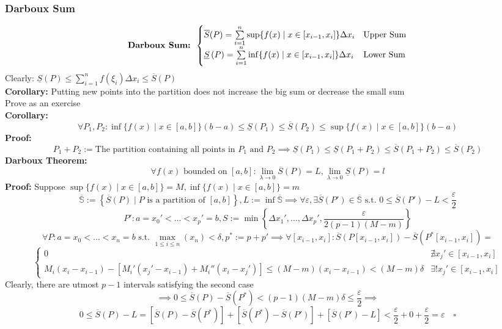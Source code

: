 \documentclass{article}
\newcommand{\st}{\mbox{ s.t. }}
\newcommand{\0}{{\bf{0}}}
\begin{document}
\subsubsection{Darboux Sum}
$$\text{\textbf{Darboux Sum: }}\begin{cases}
    \overline{S}(P)=\sum\limits_{i=1}^n\sup\{f(x)\mid x\in[x_{i-1},x_i]\}\Delta x_{i}&\mbox{Upper Sum}\\
    \underline{S}\left(P\right)=\sum\limits_{i=1}^n\inf\{f(x)\mid x\in[x_{i-1},x_i]\}\Delta x_{i}&\mbox{Lower Sum}
\end{cases}$$
Clearly: $\underline{S}(P)\le\sum\limits_{i=1}^{n}f\left(\xi_{i}\right)\Delta x_{i}\le\overline{S}(P)$\\
\textbf{Corollary: }Putting new points into the partition does not increase the big sum or decrease the small sum\\
\null\hfill{Prove as an exercise}\\
\textbf{Corollary:}
$$\forall P_1,P_2:\inf\{f(x)\mid x\in[a,b]\}(b-a)\le\underline{S}(P_1)\le\overline{S}(P_2)\le\sup\{f(x)\mid x\in[a,b]\}(b-a)$$
\textbf{Proof:}
$$P_1+P_2:=\mbox{The partition containing all points in }P_1\mbox{ and }P_2\implies\underline{S}(P_1)\le\underline{S}(P_1+P_2)\le\overline{S}(P_1+P_2)\le\overline{S}(P_2)$$
\textbf{Darboux Theorem:}
$$\forall f(x)\mbox{ bounded on }[a,b]:\lim_{\lambda\to0}\overline{S}(P)=L,\lim_{\lambda\to0}\underline{S}(P)=l$$
\textbf{Proof:}
Suppose $\sup\{f(x)\mid x\in[a,b]\}=M,\inf\{f(x)\mid x\in[a,b]\}=m$
$$\overline{\mathbb{S}}:=\left\{\overline{S}(P)\mid P\mbox{ is a partition of }[a,b]\right\},L:=\inf\overline{\mathbb{S}}\implies\forall\varepsilon,\exists\overline{S}(P')\in\overline{\mathbb{S}}\st0\le\overline{S}(P')-L<\frac{\varepsilon}{2}$$
$$P':a=x_0'<\dots<x_p'=b,S:=\min\left\{\Delta x_1',\dots,\Delta x_p',\frac{\varepsilon}{2(p-1)(M-m)}\right\}$$
$$\forall P:a=x_0<\dots<x_n=b\st\max_{1\le i\le n}(x_n)<\delta,p^*:=p+p'\implies\forall[x_{i-1},x_i]:\overline{S}(P[x_{i-1},x_i])-\overline{S}(P^*[x_{i-1},x_i])=$$
$$\begin{cases}
    0&\nexists x_j'\in[x_{i-1},x_i]\\
    M_i(x_i-x_{i-1})-\left[M_i'(x_j'-x_{i-1})+M_i''(x_i-x_j')\right]\le(M-m)(x_i-x_{i-1})<(M-m)\delta&\exists!x_j'\in[x_{i-1},x_i]
\end{cases}$$
Clearly, there are utmost $p-1$ intervals satisfying the second case
$$\implies0\le\overline{S}(P)-\overline{S}(P^*)<(p-1)(M-m)\delta\le\frac{\varepsilon}{2}\implies$$
$$0\le\overline{S}(P)-L=\left[\overline{S}(P)-\overline{S}(P^*)\right]+\left[\overline{S}(P^*)-\overline{S}(P')\right]+\left[\overline{S}(P')-L\right]<\frac{\varepsilon}{2}+0+\frac{\varepsilon}{2}=\varepsilon\quad\square$$
\end{document}
